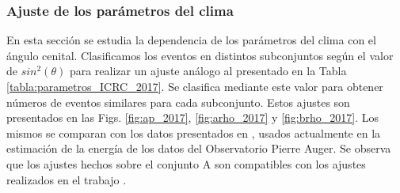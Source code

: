         \subsubsection{Ajuste de los parámetros del clima}
        En esta sección se estudia la dependencia de los parámetros del clima con el ángulo cenital. Clasificamos los eventos en distintos subconjuntos según el valor de $sin^2(\theta)$ para realizar un ajuste análogo al presentado en la Tabla \ref{tabla:parametros_ICRC_2017}. Se clasifica mediante este valor para obtener números de eventos similares para cada subconjunto. Estos ajustes son presentados en las Figs. \ref{fig:ap_2017}, \ref{fig:arho_2017} y \ref{fig:brho_2017}. Los mismos se comparan con los datos presentados en \cite{aab2017impact}, usados actualmente en la estimación  de la energía de los datos del Observatorio Pierre Auger. Se observa que los ajustes hechos sobre el conjunto A son compatibles con los ajustes realizados en  el trabajo \cite{aab2017impact}. 

